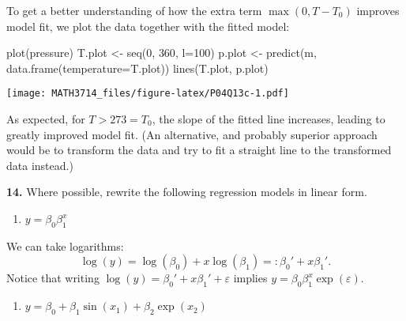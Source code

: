 \documentclass[
  a4paper,
]{article}
\newenvironment{Shaded}{\begin{snugshade}}{\end{snugshade}}
\newcommand{\AttributeTok}[1]{\textcolor[rgb]{0.77,0.63,0.00}{#1}}
\newcommand{\DecValTok}[1]{\textcolor[rgb]{0.00,0.00,0.81}{#1}}
\newcommand{\FunctionTok}[1]{\textcolor[rgb]{0.00,0.00,0.00}{#1}}
\newcommand{\NormalTok}[1]{#1}
\newcommand{\OtherTok}[1]{\textcolor[rgb]{0.56,0.35,0.01}{#1}}
\providecommand{\tightlist}{%
  \setlength{\itemsep}{0pt}\setlength{\parskip}{0pt}}
\theoremstyle{definition}
\theoremstyle{definition}
\theoremstyle{definition}
\theoremstyle{definition}
\theoremstyle{remark}
\begin{document}
\begin{myanswers}
To get a better understanding of how the extra term
\(\max(0, T-T_0)\) improves model fit, we plot the data
together with the fitted model:

\begin{Shaded}
\begin{Highlighting}[]
\FunctionTok{plot}\NormalTok{(pressure)}
\NormalTok{T.plot }\OtherTok{\textless{}{-}} \FunctionTok{seq}\NormalTok{(}\DecValTok{0}\NormalTok{, }\DecValTok{360}\NormalTok{, }\AttributeTok{l=}\DecValTok{100}\NormalTok{)}
\NormalTok{p.plot }\OtherTok{\textless{}{-}} \FunctionTok{predict}\NormalTok{(m, }\FunctionTok{data.frame}\NormalTok{(}\AttributeTok{temperature=}\NormalTok{T.plot))}
\FunctionTok{lines}\NormalTok{(T.plot, p.plot)}
\end{Highlighting}
\end{Shaded}

\texttt{[image: MATH3714\_files/figure-latex/P04Q13c-1.pdf]}

As expected, for \(T > 273 = T_0\), the slope of the
fitted line increases, leading to greatly improved
model fit. (An alternative, and probably superior approach would
be to transform the data and try to fit a straight line to the
transformed data instead.)

\end{myanswers}

\textbf{14.} Where possible, rewrite the following regression models in linear form.

\begin{enumerate}
\def\labelenumi{\alph{enumi}.}
\tightlist
\item
  \(y = \beta_0 \beta_1^x\)
\end{enumerate}

\begin{myanswers}
We can take logarithms:
\begin{equation*}
  \log(y)
  = \log(\beta_0) + x \log(\beta_1)
  =: \beta_0' + x \beta_1'.
\end{equation*}
Notice that writing \(\log(y) = \beta_0' + x \beta_1' + \varepsilon\)
implies \(y = \beta_0 \beta_1^x \exp(\varepsilon)\).

\end{myanswers}

\begin{enumerate}
\def\labelenumi{\alph{enumi}.}
\setcounter{enumi}{1}
\tightlist
\item
  \(y = \beta_0 + \beta_1 \sin(x_1) + \beta_2 \exp(x_2)\)
\end{enumerate}
\end{document}

